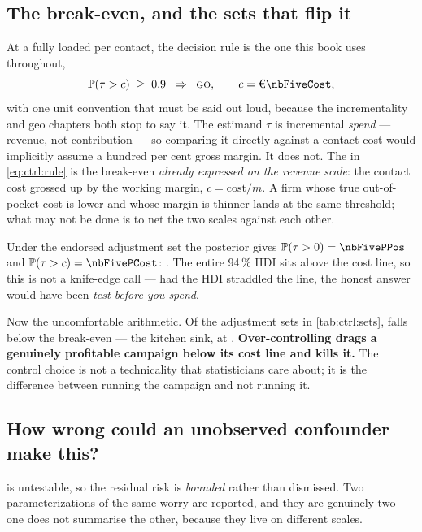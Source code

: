 \subsection*{The break-even, and the sets that flip it}

At a fully loaded \eur{\nbFiveCost} per contact, the decision rule is the one this book uses
throughout,
%
\begin{equation}
  \Prob(\tau > c) \;\ge\; 0.9 \;\;\Rightarrow\;\; \textsc{go},
  \qquad c = \eur{\nbFiveCost},
  \label{eq:ctrl:rule}
\end{equation}
%
with one unit convention that must be said out loud, because the incrementality and geo chapters
both stop to say it. The estimand $\tau$ is incremental \emph{spend} --- revenue, not contribution
--- so comparing it directly against a contact cost would implicitly assume a hundred per cent
gross margin. It does not. The \eur{\nbFiveCost} in \cref{eq:ctrl:rule} is the break-even
\emph{already expressed on the revenue scale}: the contact cost grossed up by the working margin,
$c = \text{cost}/m$. A firm whose true out-of-pocket cost is lower and whose margin is thinner
lands at the same threshold; what may not be done is to net the two scales against each other.

Under the endorsed adjustment set the posterior gives
$\Prob(\tau > 0) = \nbFivePPos$ and $\Prob(\tau > c) = \nbFivePCost$: \textbf{\nbFiveDecision}.
The entire 94\,\% HDI sits above the cost line, so this is not a knife-edge call --- had the HDI
straddled the line, the honest answer would have been \emph{test before you spend}.

Now the uncomfortable arithmetic. Of the \nbFiveNSets{} adjustment sets in
\cref{tab:ctrl:sets}, \nbFiveNBelowCost{} falls below the \eur{\nbFiveCost} break-even --- the
kitchen sink, at \eur{\nbFiveKsBar}. \textbf{Over-controlling drags a genuinely profitable
campaign below its cost line and kills it.} The control choice is not a technicality that
statisticians care about; it is the difference between running the campaign and not running it.

\subsection*{How wrong could an unobserved confounder make this?}

 is untestable, so the residual risk is \emph{bounded} rather than
dismissed. Two parameterizations of the same worry are reported, and they are genuinely two ---
one does not summarise the other, because they live on different scales.

